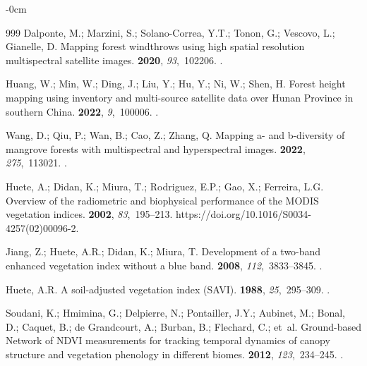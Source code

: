 \documentclass[applsci,article,accept,pdftex,moreauthors]{Definitions/mdpi}
\begin{document}
\begin{adjustwidth}{-\extralength}{0cm}
\begin{thebibliography}{999}
Dalponte, M.; Marzini, S.; Solano-Correa, Y.T.; Tonon, G.; Vescovo, L.;
  Gianelle, D.
\newblock Mapping forest windthrows using high spatial resolution multispectral
  satellite images.
 {\bf 2020}, {\em 93},~102206.
.

Huang, W.; Min, W.; Ding, J.; Liu, Y.; Hu, Y.; Ni, W.; Shen, H.
\newblock Forest height mapping using inventory and multi-source satellite data
  over Hunan Province in southern China.
 {\bf 2022}, {\em 9},~100006.
.

Wang, D.; Qiu, P.; Wan, B.; Cao, Z.; Zhang, Q.
\newblock Mapping a- and b-diversity of mangrove forests with multispectral and
  hyperspectral images.
 {\bf 2022}, {\em 275},~113021.
.

Huete, A.; Didan, K.; Miura, T.; Rodriguez, E.P.; Gao, X.; Ferreira, L.G.
\newblock Overview of the radiometric and biophysical performance of the MODIS
  vegetation indices.
 {\bf 2002}, {\em 83},~195--213. 
  {{https://doi.org/10.1016/S0034-4257(02)00096-2}}.

Jiang, Z.; Huete, A.R.; Didan, K.; Miura, T.
\newblock Development of a two-band enhanced vegetation index without a blue
  band.
 {\bf 2008}, {\em
  112},~3833--3845.
.

Huete, A.R.
\newblock A soil-adjusted vegetation index (SAVI).
 {\bf 1988}, {\em 25},~295--309.
.

Soudani, K.; Hmimina, G.; Delpierre, N.; Pontailler, J.Y.; Aubinet, M.; Bonal,
  D.; Caquet, B.; {de Grandcourt}, A.; Burban, B.; Flechard, C.;  et~al.
\newblock Ground-based Network of NDVI measurements for tracking temporal
  dynamics of canopy structure and vegetation phenology in different biomes.
 {\bf 2012}, {\em 123},~234--245.
.


\end{thebibliography}
\end{adjustwidth}
\end{document}
